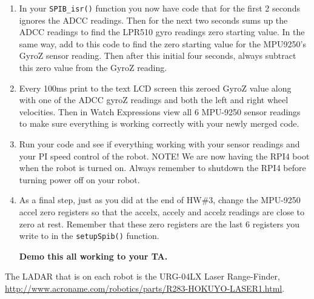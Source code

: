 \documentclass[11pt]{article}
\begin{document}
\begin{enumerate}
\begin{verbatim}
    SpibRegs.SPIFFRX.bit.RXFFOVFCLR=1; // Clear Overflow flag
    SpibRegs.SPIFFRX.bit.RXFFINTCLR=1; // Clear Interrupt flag
    PieCtrlRegs.PIEACK.all = PIEACK_GROUP6;
}
\end{verbatim}
        \item In your \texttt{SPIB_isr()} function you now have code that for the first 2 seconds ignores the ADCC readings. Then for the next two seconds sums up the ADCC readings to find the LPR510 gyro readings zero starting value. In the same way, add to this code to find the zero starting value for the MPU9250’s GyroZ sensor reading. Then after this initial four seconds, always subtract this zero value from the GyroZ reading.
    \item Every 100ms print to the text LCD screen this zeroed GyroZ value along with one of the ADCC gyroZ readings and both the left and right wheel velocities. Then in Watch Expressions view all 6 MPU-9250 sensor readings to make sure everything is working correctly with your newly merged code.
    \item Run your code and see if everything working with your sensor readings and your PI speed control of the robot. NOTE! We are now having the RPI4 boot when the robot is turned on. Always remember to shutdown the RPI4 before turning power off on your robot.
        \item As a final step, just as you did at the end of HW\#3, change the MPU-9250 accel zero registers so that the accelx, accely and accelz readings are close to zero at rest. Remember that these zero registers are the last 6 registers you write to in the \texttt{setupSpib()} function.
        \begin{checkoff}
                \textbf{Demo this all working to your TA.}
        \end{checkoff}
\end{enumerate}
%

The LADAR that is on each robot is the URG-04LX Laser Range-Finder, \url{http://www.acroname.com/robotics/parts/R283-HOKUYO-LASER1.html}.
\end{document}
